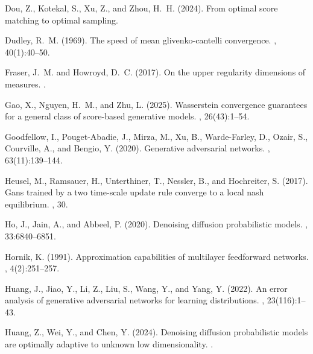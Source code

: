 \documentclass[12pts]{article}
\begin{document}
\begin{thebibliography}{}
Dou, Z., Kotekal, S., Xu, Z., and Zhou, H.~H. (2024).
\newblock From optimal score matching to optimal sampling.

Dudley, R.~M. (1969).
\newblock The speed of mean glivenko-cantelli convergence.
, 40(1):40--50.

Fraser, J.~M. and Howroyd, D.~C. (2017).
\newblock On the upper regularity dimensions of measures.
.

Gao, X., Nguyen, H.~M., and Zhu, L. (2025).
\newblock Wasserstein convergence guarantees for a general class of score-based generative models.
, 26(43):1--54.

Goodfellow, I., Pouget-Abadie, J., Mirza, M., Xu, B., Warde-Farley, D., Ozair, S., Courville, A., and Bengio, Y. (2020).
\newblock Generative adversarial networks.
, 63(11):139--144.

Heusel, M., Ramsauer, H., Unterthiner, T., Nessler, B., and Hochreiter, S. (2017).
\newblock Gans trained by a two time-scale update rule converge to a local nash equilibrium.
, 30.

Ho, J., Jain, A., and Abbeel, P. (2020).
\newblock Denoising diffusion probabilistic models.
, 33:6840--6851.

Hornik, K. (1991).
\newblock Approximation capabilities of multilayer feedforward networks.
, 4(2):251--257.

Huang, J., Jiao, Y., Li, Z., Liu, S., Wang, Y., and Yang, Y. (2022).
\newblock An error analysis of generative adversarial networks for learning distributions.
, 23(116):1--43.

Huang, Z., Wei, Y., and Chen, Y. (2024).
\newblock Denoising diffusion probabilistic models are optimally adaptive to unknown low dimensionality.
.


\end{thebibliography}
\end{document}

